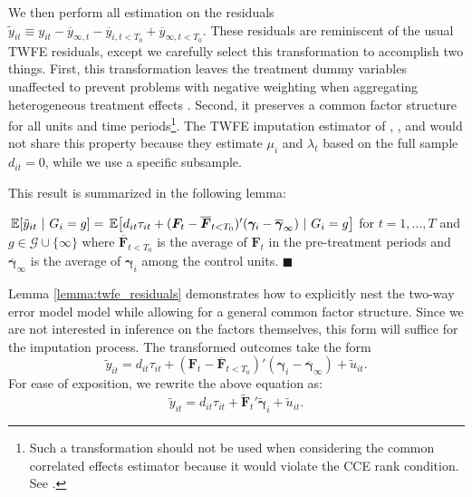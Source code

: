 We then perform all estimation on the residuals $\tilde{y}_{it} \equiv y_{it} - \overline{y}_{\infty, t} - \overline{y}_{i,t < T_0} + \overline{y}_{\infty, t < T_0}$. These residuals are reminiscent of the usual TWFE residuals, except we carefully select this transformation to accomplish two things. First, this transformation leaves the treatment dummy variables unaffected to prevent problems with negative weighting when aggregating heterogeneous treatment effects \citep{Goodman-Bacon_2021,Borusyak_Jaravel_Spiess_2021}. Second, it preserves a common factor structure for all units and time periods\footnote{Such a transformation should not be used when considering the common correlated effects estimator because it would violate the CCE rank condition. See \citet{Brown_Butts_Westerlund_2023}.}. The TWFE imputation estimator of \citet{Gardner_2021}, \citet{Wooldridge_2021}, and \citet{Borusyak_Jaravel_Spiess_2021} would not share this property because they estimate $\mu_i$ and $\lambda_t$ based on the full sample $d_{it} = 0$, while we use a specific subsample.

This result is summarized in the following lemma:
\begin{lemma}\label{lemma:twfe_residuals}
  $\expec{\tilde{y}_{it}}{G_i = g} = \expec{d_{it}\tau_{it} + (\bm{F}_t - \overline{\bm{F}}_{t < T_0})' (\bm \gamma_i - \overline{\bm \gamma}_{\infty}) }{G_i = g}$ for $t = 1,...,T$ and $g \in \mathcal{G} \cup \{ \infty \}$ where $\overline{\bm{F}}_{t < T_0}$ is the average of $\bm{F}_t$ in the pre-treatment periods and $\overline{\bm\gamma}_\infty$ is the average of $\bm \gamma_i$ among the control units. $\blacksquare$
\end{lemma}

Lemma \ref{lemma:twfe_residuals} demonstrates how to explicitly nest the two-way error model model while allowing for a general common factor structure. Since we are not interested in inference on the factors themselves, this form will suffice for the imputation process. The transformed outcomes take the form
\begin{equation}
  \tilde{y}_{it} = d_{it} \tau_{it} + (\bm{F}_t - \overline{\bm{F}}_{t < T_0})' (\bm \gamma_i - \overline{\bm \gamma}_\infty) + \tilde{u}_{it}.
\end{equation}
For ease of exposition, we rewrite the above equation as:
\begin{equation}
  \tilde{y}_{it} = d_{it} \tau_{it} + \tilde{\bm{F}}_t' \tilde{\bm \gamma}_i + \tilde{u}_{it}.
\end{equation}

